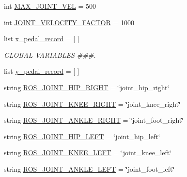 \begin{DoxyCompactItemize}
\item 
int \mbox{\hyperlink{namespacejoint__angle__velocity__factor__test_a264fd95a75c1fdb4d1ca281c02530efb}{M\+A\+X\+\_\+\+J\+O\+I\+N\+T\+\_\+\+V\+EL}} = 500
\item 
int \mbox{\hyperlink{namespacejoint__angle__velocity__factor__test_a32de35685ebc1b8a74f4d32f1d29c9a5}{J\+O\+I\+N\+T\+\_\+\+V\+E\+L\+O\+C\+I\+T\+Y\+\_\+\+F\+A\+C\+T\+OR}} = 1000
\item 
list \mbox{\hyperlink{namespacejoint__angle__velocity__factor__test_a4a0c0e53f8765b09a181b9a4a99c11a8}{x\+\_\+pedal\+\_\+record}} = \mbox{[} \mbox{]}
\begin{DoxyCompactList}\small\item\em G\+L\+O\+B\+AL V\+A\+R\+I\+A\+B\+L\+ES \#\#\#. \end{DoxyCompactList}\item 
list \mbox{\hyperlink{namespacejoint__angle__velocity__factor__test_a3b3b88f2814ab8d781c35d2b10785bbf}{y\+\_\+pedal\+\_\+record}} = \mbox{[} \mbox{]}
\item 
string \mbox{\hyperlink{namespacejoint__angle__velocity__factor__test_a239be78ab1e627c58663be89473304ae}{R\+O\+S\+\_\+\+J\+O\+I\+N\+T\+\_\+\+H\+I\+P\+\_\+\+R\+I\+G\+HT}} = \char`\"{}joint\+\_\+hip\+\_\+right\char`\"{}
\item 
string \mbox{\hyperlink{namespacejoint__angle__velocity__factor__test_a23d218a71ee67e229bd05b861de44e5c}{R\+O\+S\+\_\+\+J\+O\+I\+N\+T\+\_\+\+K\+N\+E\+E\+\_\+\+R\+I\+G\+HT}} = \char`\"{}joint\+\_\+knee\+\_\+right\char`\"{}
\item 
string \mbox{\hyperlink{namespacejoint__angle__velocity__factor__test_a528f3e12be6b9706edf329096b9ba1e9}{R\+O\+S\+\_\+\+J\+O\+I\+N\+T\+\_\+\+A\+N\+K\+L\+E\+\_\+\+R\+I\+G\+HT}} = \char`\"{}joint\+\_\+foot\+\_\+right\char`\"{}
\item 
string \mbox{\hyperlink{namespacejoint__angle__velocity__factor__test_a85baf5f9f6fb73ca618c1bbcd2524f1d}{R\+O\+S\+\_\+\+J\+O\+I\+N\+T\+\_\+\+H\+I\+P\+\_\+\+L\+E\+FT}} = \char`\"{}joint\+\_\+hip\+\_\+left\char`\"{}
\item 
string \mbox{\hyperlink{namespacejoint__angle__velocity__factor__test_a92e931c6b458e77d3a15d2cd50201863}{R\+O\+S\+\_\+\+J\+O\+I\+N\+T\+\_\+\+K\+N\+E\+E\+\_\+\+L\+E\+FT}} = \char`\"{}joint\+\_\+knee\+\_\+left\char`\"{}
\item 
string \mbox{\hyperlink{namespacejoint__angle__velocity__factor__test_a5abc0d29cf52bcc6c9e5615d44c691c5}{R\+O\+S\+\_\+\+J\+O\+I\+N\+T\+\_\+\+A\+N\+K\+L\+E\+\_\+\+L\+E\+FT}} = \char`\"{}joint\+\_\+foot\+\_\+left\char`\"{}

\end{DoxyCompactItemize}

